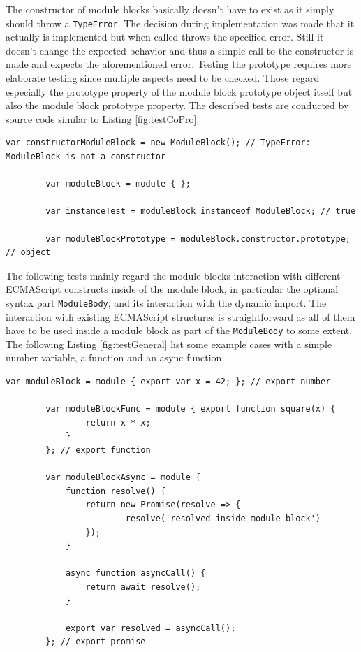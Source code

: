 The constructor of module blocks basically doesn't have to exist as it simply should throw a \texttt{TypeError}. The decision during implementation was made that it actually is implemented but when called throws the specified error. Still it doesn't change the expected behavior and thus a simple call to the constructor is made and expects the aforementioned error. Testing the prototype requires more elaborate testing since multiple aspects need to be checked. Those regard especially the prototype property of the module block prototype object itself but also the module block prototype property. The described tests are conducted by source code similar to Listing \ref{fig:testCoPro}.

    \begin{lstlisting}[caption={Module block constructor and prototype tests}, label={fig:testCoPro}]
        var constructorModuleBlock = new ModuleBlock(); // TypeError: ModuleBlock is not a constructor
        
        var moduleBlock = module { };
        
        var instanceTest = moduleBlock instanceof ModuleBlock; // true
        
        var moduleBlockPrototype = moduleBlock.constructor.prototype; // object
    \end{lstlisting}

The following tests mainly regard the module blocks interaction with different ECMAScript constructs inside of the module block, in particular the optional syntax part \texttt{ModuleBody}, and its interaction with the dynamic import. The interaction with existing ECMAScript structures is straightforward as all of them have to be used inside a module block as part of the \texttt{ModuleBody} to some extent. The following Listing \ref{fig:testGeneral} list some example cases with a simple number variable, a function and an async function.

    \begin{lstlisting}[caption={Module block general test example cases}, label={fig:testGeneral}]
        var moduleBlock = module { export var x = 42; }; // export number
        
        var moduleBlockFunc = module { export function square(x) {
                return x * x;
            } 
        }; // export function
    
        var moduleBlockAsync = module {
            function resolve() {
                return new Promise(resolve => {
                        resolve('resolved inside module block')
                });
            }
        
            async function asyncCall() {
                return await resolve();
            }
        
            export var resolved = asyncCall(); 
        }; // export promise
    \end{lstlisting}

